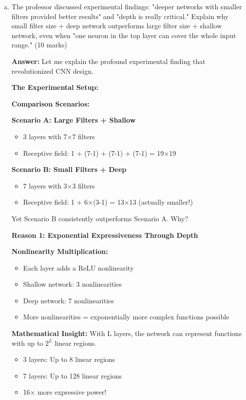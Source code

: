 \documentclass[12pt]{article}
\newcommand{\answer}[1]{{\color{answercolor}\textbf{Answer:} #1}}
\newcommand{\explanation}[1]{{\color{explanationcolor}#1}}
\begin{document}
\begin{enumerate}[(a)]
    \item The professor discussed experimental findings: "deeper networks with smaller filters provided better results" and "depth is really critical." Explain why small filter size + deep network outperforms large filter size + shallow network, even when "one neuron in the top layer can cover the whole input range." \hfill (10 marks)
    
    \answer{
    Let me explain the profound experimental finding that revolutionized CNN design.
    
    \textbf{The Experimental Setup:}
    
    \explanation{
    \textbf{Comparison Scenarios:}
    
    \textbf{Scenario A: Large Filters + Shallow}
    \begin{itemize}
        \item 3 layers with 7×7 filters
        \item Receptive field: 1 + (7-1) + (7-1) + (7-1) = 19×19
    \end{itemize}
    
    \textbf{Scenario B: Small Filters + Deep}
    \begin{itemize}
        \item 7 layers with 3×3 filters  
        \item Receptive field: 1 + 6×(3-1) = 13×13 (actually smaller!)
    \end{itemize}
    
    Yet Scenario B consistently outperforms Scenario A. Why?
    }
    
    \textbf{Reason 1: Exponential Expressiveness Through Depth}
    
    \explanation{
    \textbf{Nonlinearity Multiplication:}
    \begin{itemize}
        \item Each layer adds a ReLU nonlinearity
        \item Shallow network: 3 nonlinearities
        \item Deep network: 7 nonlinearities
        \item More nonlinearities = exponentially more complex functions possible
    \end{itemize}
    
    \textbf{Mathematical Insight:}
    With L layers, the network can represent functions with up to $2^L$ linear regions.
    \begin{itemize}
        \item 3 layers: Up to 8 linear regions
        \item 7 layers: Up to 128 linear regions
        \item 16× more expressive power!
    \end{itemize}
    
}}
\end{enumerate}
\end{document}
